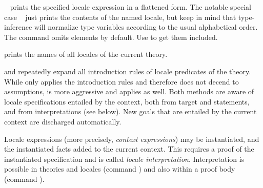 \begin{isabellebody}
\begin{isamarkuptext}
\begin{descr}
  \item [\mbox{\isa{\isacommand{print{\isacharunderscore}locale}}}~\isa{{\isachardoublequote}import\ {\isacharplus}\ body{\isachardoublequote}}] prints the
  specified locale expression in a flattened form.  The notable
  special case \mbox{}~ just prints the
  contents of the named locale, but keep in mind that type-inference
  will normalize type variables according to the usual alphabetical
  order.  The command omits \mbox{} elements by default.
  Use \mbox{}\isa{{\isachardoublequote}{\isacharbang}{\isachardoublequote}} to get them included.

  \item [\mbox{\isa{\isacommand{print{\isacharunderscore}locales}}}] prints the names of all locales
  of the current theory.

  \item [\mbox{\isa{intro{\isacharunderscore}locales}} and \mbox{\isa{unfold{\isacharunderscore}locales}}]
  repeatedly expand all introduction rules of locale predicates of the
  theory.  While \mbox{} only applies the  introduction rules and therefore does not decend to
  assumptions, \mbox{} is more aggressive and applies
   as well.  Both methods are aware of locale
  specifications entailed by the context, both from target and
  \mbox{} statements, and from interpretations (see
  below).  New goals that are entailed by the current context are
  discharged automatically.

  \end{descr}%
\end{isamarkuptext}%
\isamarkuptrue%
%
\isamarkuptrue%
%
\begin{isamarkuptext}%
Locale expressions (more precisely, \emph{context expressions}) may
  be instantiated, and the instantiated facts added to the current
  context.  This requires a proof of the instantiated specification
  and is called \emph{locale interpretation}.  Interpretation is
  possible in theories and locales (command \mbox{}) and also within a proof body (command \mbox{}).


\end{isamarkuptext}
\end{isabellebody}
